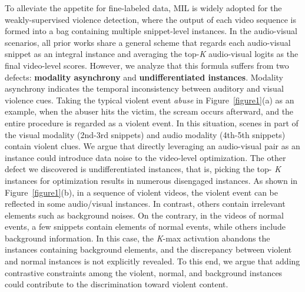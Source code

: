 \documentclass[sigconf]{acmart}
\begin{document}
To alleviate the appetite for fine-labeled data, MIL is widely adopted for the weakly-supervised violence detection, where the output of each video sequence is formed into a bag containing multiple snippet-level instances. In the audio-visual scenarios, all prior works share a general scheme that regards each audio-visual snippet as an integral instance and averaging the top-\textit{K} audio-visual logits as the final video-level scores. However, we analyze that this formula suffers from two defects: \textbf{modality asynchrony} and \textbf{undifferentiated instances}. Modality asynchrony indicates the temporal inconsistency between auditory and visual violence cues. Taking the typical violent event \textit{abuse} in Figure~\ref{figure1}(a) as an example, when the abuser hits the victim, the scream occurs afterward, and the entire procedure is regarded as a violent event. In this situation, scenes in part of the visual modality (2nd-3rd snippets) and audio modality (4th-5th snippets) contain violent clues. We argue that directly leveraging an audio-visual pair as an instance could introduce data noise to the video-level optimization. The other defect we discovered is undifferentiated instances, that is, picking the top-
\textit{K} instances for optimization results in numerous disengaged instances. As shown in Figure~\ref{figure1}(b), in a sequence of violent videos, the violent event can be reflected in some audio/visual instances. In contrast, others contain irrelevant elements such as background noises. On the contrary, in the videos of normal events, a few snippets contain elements of normal events, while others include background information. In this case, the \textit{K}-max activation abandons the instances containing background elements, and the discrepancy between violent and normal instances is not explicitly revealed. To this end, we argue that adding contrastive constraints among the violent, normal, and background instances could contribute to the discrimination toward violent content.
\end{document}
